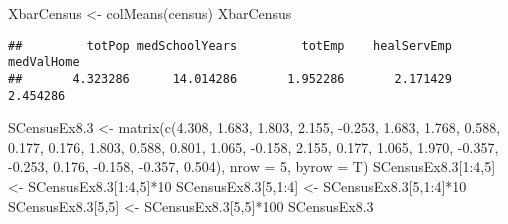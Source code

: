\documentclass[
]{article}
\newenvironment{Shaded}{\begin{snugshade}}{\end{snugshade}}
\newcommand{\AttributeTok}[1]{\textcolor[rgb]{0.77,0.63,0.00}{#1}}
\newcommand{\DecValTok}[1]{\textcolor[rgb]{0.00,0.00,0.81}{#1}}
\newcommand{\FloatTok}[1]{\textcolor[rgb]{0.00,0.00,0.81}{#1}}
\newcommand{\FunctionTok}[1]{\textcolor[rgb]{0.00,0.00,0.00}{#1}}
\newcommand{\NormalTok}[1]{#1}
\newcommand{\OtherTok}[1]{\textcolor[rgb]{0.56,0.35,0.01}{#1}}
\newcommand{\SpecialCharTok}[1]{\textcolor[rgb]{0.00,0.00,0.00}{#1}}
\begin{document}
\begin{Shaded}
\begin{Highlighting}[]
\NormalTok{XbarCensus }\OtherTok{\textless{}{-}} \FunctionTok{colMeans}\NormalTok{(census)}
\NormalTok{XbarCensus}
\end{Highlighting}
\end{Shaded}

\begin{verbatim}
##         totPop medSchoolYears         totEmp    healServEmp     medValHome 
##       4.323286      14.014286       1.952286       2.171429       2.454286
\end{verbatim}

\begin{Shaded}
\begin{Highlighting}[]
\NormalTok{SCensusEx8}\FloatTok{.3} \OtherTok{\textless{}{-}} \FunctionTok{matrix}\NormalTok{(}\FunctionTok{c}\NormalTok{(}\FloatTok{4.308}\NormalTok{, }\FloatTok{1.683}\NormalTok{, }\FloatTok{1.803}\NormalTok{, }\FloatTok{2.155}\NormalTok{, }\SpecialCharTok{{-}}\FloatTok{0.253}\NormalTok{, }
                         \FloatTok{1.683}\NormalTok{, }\FloatTok{1.768}\NormalTok{, }\FloatTok{0.588}\NormalTok{, }\FloatTok{0.177}\NormalTok{, }\FloatTok{0.176}\NormalTok{, }
                         \FloatTok{1.803}\NormalTok{, }\FloatTok{0.588}\NormalTok{, }\FloatTok{0.801}\NormalTok{, }\FloatTok{1.065}\NormalTok{, }\SpecialCharTok{{-}}\FloatTok{0.158}\NormalTok{, }
                         \FloatTok{2.155}\NormalTok{, }\FloatTok{0.177}\NormalTok{, }\FloatTok{1.065}\NormalTok{, }\FloatTok{1.970}\NormalTok{, }\SpecialCharTok{{-}}\FloatTok{0.357}\NormalTok{, }
                         \SpecialCharTok{{-}}\FloatTok{0.253}\NormalTok{, }\FloatTok{0.176}\NormalTok{, }\SpecialCharTok{{-}}\FloatTok{0.158}\NormalTok{, }\SpecialCharTok{{-}}\FloatTok{0.357}\NormalTok{, }\FloatTok{0.504}\NormalTok{), }\AttributeTok{nrow =} \DecValTok{5}\NormalTok{, }\AttributeTok{byrow =}\NormalTok{ T)}
\NormalTok{SCensusEx8}\FloatTok{.3}\NormalTok{[}\DecValTok{1}\SpecialCharTok{:}\DecValTok{4}\NormalTok{,}\DecValTok{5}\NormalTok{] }\OtherTok{\textless{}{-}}\NormalTok{ SCensusEx8}\FloatTok{.3}\NormalTok{[}\DecValTok{1}\SpecialCharTok{:}\DecValTok{4}\NormalTok{,}\DecValTok{5}\NormalTok{]}\SpecialCharTok{*}\DecValTok{10}
\NormalTok{SCensusEx8}\FloatTok{.3}\NormalTok{[}\DecValTok{5}\NormalTok{,}\DecValTok{1}\SpecialCharTok{:}\DecValTok{4}\NormalTok{] }\OtherTok{\textless{}{-}}\NormalTok{ SCensusEx8}\FloatTok{.3}\NormalTok{[}\DecValTok{5}\NormalTok{,}\DecValTok{1}\SpecialCharTok{:}\DecValTok{4}\NormalTok{]}\SpecialCharTok{*}\DecValTok{10}
\NormalTok{SCensusEx8}\FloatTok{.3}\NormalTok{[}\DecValTok{5}\NormalTok{,}\DecValTok{5}\NormalTok{] }\OtherTok{\textless{}{-}}\NormalTok{ SCensusEx8}\FloatTok{.3}\NormalTok{[}\DecValTok{5}\NormalTok{,}\DecValTok{5}\NormalTok{]}\SpecialCharTok{*}\DecValTok{100}
\NormalTok{SCensusEx8}\FloatTok{.3}
\end{Highlighting}
\end{Shaded}
\end{document}
